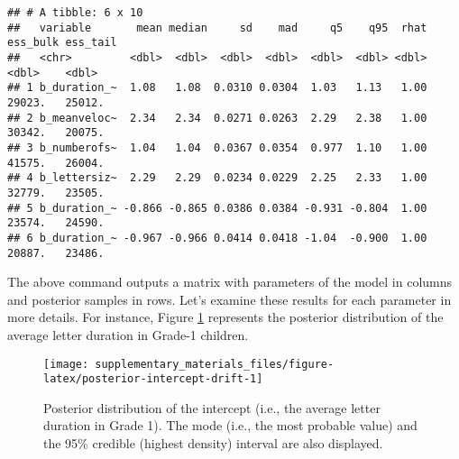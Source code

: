 \documentclass[
  11pt,
  english,
  ,doc,floatsintext]{apa6}
\newenvironment{Shaded}{}{}
\newcommand{\AttributeTok}[1]{\textcolor[rgb]{0.49,0.56,0.16}{#1}}
\newcommand{\CommentTok}[1]{\textcolor[rgb]{0.38,0.63,0.69}{\textit{#1}}}
\newcommand{\ConstantTok}[1]{\textcolor[rgb]{0.53,0.00,0.00}{#1}}
\newcommand{\FunctionTok}[1]{\textcolor[rgb]{0.02,0.16,0.49}{#1}}
\newcommand{\NormalTok}[1]{#1}
\newcommand{\OtherTok}[1]{\textcolor[rgb]{0.00,0.44,0.13}{#1}}
\newcommand{\SpecialCharTok}[1]{\textcolor[rgb]{0.25,0.44,0.63}{#1}}
\newcommand{\StringTok}[1]{\textcolor[rgb]{0.25,0.44,0.63}{#1}}
\begin{document}
\begin{verbatim}
## # A tibble: 6 x 10
##   variable       mean median     sd    mad     q5    q95  rhat ess_bulk ess_tail
##   <chr>         <dbl>  <dbl>  <dbl>  <dbl>  <dbl>  <dbl> <dbl>    <dbl>    <dbl>
## 1 b_duration_~  1.08   1.08  0.0310 0.0304  1.03   1.13   1.00   29023.   25012.
## 2 b_meanveloc~  2.34   2.34  0.0271 0.0263  2.29   2.38   1.00   30342.   20075.
## 3 b_numberofs~  1.04   1.04  0.0367 0.0354  0.977  1.10   1.00   41575.   26004.
## 4 b_lettersiz~  2.29   2.29  0.0234 0.0229  2.25   2.33   1.00   32779.   23505.
## 5 b_duration_~ -0.866 -0.865 0.0386 0.0384 -0.931 -0.804  1.00   23574.   24590.
## 6 b_duration_~ -0.967 -0.966 0.0414 0.0418 -1.04  -0.900  1.00   20887.   23486.
\end{verbatim}

The above command outputs a matrix with parameters of the model in columns and posterior samples in rows. Let's examine these results for each parameter in more details. For instance, Figure \ref{fig:posterior-intercept-drift} represents the posterior distribution of the average letter duration in Grade-1 children.

\begin{Shaded}
\end{Shaded}

\begin{figure}[!htb]

{\centering \texttt{[image: supplementary\_materials\_files/figure-latex/posterior-intercept-drift-1]} 

}

\caption{Posterior distribution of the intercept (i.e., the average letter duration in Grade 1). The mode (i.e., the most probable value) and the 95\% credible (highest density) interval are also displayed.}\label{fig:posterior-intercept-drift}
\end{figure}
\end{document}
